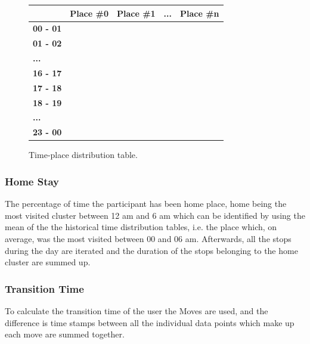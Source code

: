 \begin{figure}
    \centering
    \begin{tabular}{|l|l|l|l|l|}
    \hline
    \textbf{}        & \textbf{Place \#0} & \textbf{Place \#1} & \textbf{...} & \textbf{Place \#n} \\ \hline
    \textbf{00 - 01} &                    &                    &              &                    \\ \hline
    \textbf{01 - 02} &                    &                    &              &                    \\ \hline
    \textbf{...}     &                    &                    &              &                    \\ \hline
    \textbf{16 - 17} &                    &                    &              &                    \\ \hline
    \textbf{17 - 18} &                    &                    &              &                    \\ \hline
    \textbf{18 - 19} &                    &                    &              &                    \\ \hline
    \textbf{...}     &                    &                    &              &                    \\ \hline
    \textbf{23 - 00} &                    &                    &              &                    \\ \hline
    \end{tabular}
    \caption{Time-place distribution table.}
    \label{fig:time-table}
\end{figure}

\subsubsection{Home Stay} 
The percentage of time the participant has been home place, home being the most visited cluster between 12 am and 6 am which can be identified by using the mean of the the historical time distribution tables, i.e. the place which, on average, was the most visited between 00 and 06 am. Afterwards, all the stops during the day are iterated and the duration of the stops belonging to the home cluster are summed up.

\subsubsection{Transition Time} 
To calculate the transition time of the user the Moves are used, and the difference is time stamps between all the individual data points which make up each move are summed together. 

